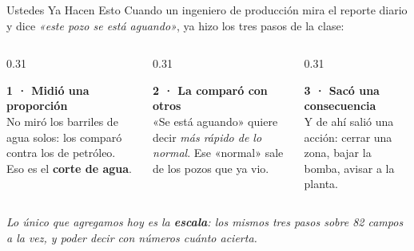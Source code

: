 \documentclass[aspectratio=169, 11pt]{beamer}
\begin{document}
\begin{frame}[shrink=8]{Ustedes Ya Hacen Esto}
  \vspace{-2pt}
  {\footnotesize\color{textMuted}
  Cuando un ingeniero de producción mira el reporte diario y dice
  \textit{«este pozo se está aguando»}, ya hizo los tres pasos de la clase:}
  \vspace{7pt}
  \begin{columns}[T]
    \begin{column}{0.31\textwidth}
      \begin{tcolorbox}[colback=arcaGray, colframe=arcaDark, boxrule=0pt,
        leftrule=3pt, arc=3pt, left=6pt, right=6pt, top=5pt, bottom=5pt]
        {\scriptsize\color{arcaDark}\bfseries 1 · Midió una proporción}\\[3pt]
        {\scriptsize\color{textMuted}
         No miró los barriles de agua solos: los comparó contra los de
         petróleo. Eso es el \textbf{corte de agua}.}
      \end{tcolorbox}
    \end{column}
    \begin{column}{0.31\textwidth}
      \begin{tcolorbox}[colback=arcaGray, colframe=arcaDark, boxrule=0pt,
        leftrule=3pt, arc=3pt, left=6pt, right=6pt, top=5pt, bottom=5pt]
        {\scriptsize\color{arcaDark}\bfseries 2 · La comparó con otros}\\[3pt]
        {\scriptsize\color{textMuted}
         «Se está aguando» quiere decir \emph{más rápido de lo normal}. Ese
         «normal» sale de los pozos que ya vio.}
      \end{tcolorbox}
    \end{column}
    \begin{column}{0.31\textwidth}
      \begin{tcolorbox}[colback=arcaGray, colframe=arcaDark, boxrule=0pt,
        leftrule=3pt, arc=3pt, left=6pt, right=6pt, top=5pt, bottom=5pt]
        {\scriptsize\color{arcaDark}\bfseries 3 · Sacó una consecuencia}\\[3pt]
        {\scriptsize\color{textMuted}
         Y de ahí salió una acción: cerrar una zona, bajar la bomba, avisar
         a la planta.}
      \end{tcolorbox}
    \end{column}
  \end{columns}
  \vspace{9pt}
  {\footnotesize\color{arcaDark}\itshape
   Lo único que agregamos hoy es la \textbf{escala}: los mismos tres pasos
   sobre 82 campos a la vez, y poder decir con números cuánto acierta.}
\end{frame}
\end{document}
